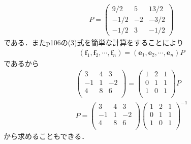 \documentclass[dvipdfmx,uplatex,11pt]{jsarticle}
\begin{document}
\begin{eqnarray*}
P=
\begin{pmatrix}
9/2 & 5  & 13/2 \\
-1/2 & -2 & -3/2 \\
-1/2 & 3 & -1/2
\end{pmatrix}
\end{eqnarray*}
である．またp106の(3)式を簡単な計算をすることにより
\begin{eqnarray*}
(\bm{f}_1,\bm{f}_2,\cdots ,\bm{f}_n)=(\bm{e}_1,\bm{e}_2,\cdots ,\bm{e}_n)P
\end{eqnarray*}
であるから
\begin{eqnarray*}
\begin{pmatrix}
3 & 4 & 3 \\
-1 & 1 & -2 \\
4 & 8 & 6 \\
\end{pmatrix}
=
\begin{pmatrix}
1 & 2 & 1 \\
0 & 1 & 1 \\
1 & 0 & 1 \\
\end{pmatrix}
P \\ 
%
%
%
P=
\begin{pmatrix}
3 & 4 & 3 \\
-1 & 1 & -2 \\
4 & 8 & 6 \\
\end{pmatrix}
\begin{pmatrix}
1 & 2 & 1 \\
0 & 1 & 1 \\
1 & 0 & 1 \\
\end{pmatrix}
^{-1}
\end{eqnarray*}
から求めることもできる．\\ \\

\newpage
\end{document}
